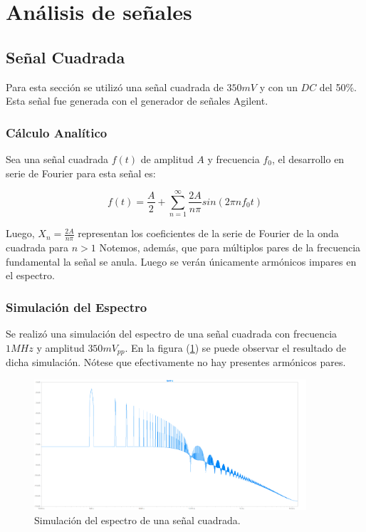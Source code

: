 \section{Análisis de señales}

\subsection{Señal Cuadrada}

Para esta sección se utilizó una señal cuadrada de $350mV$ y con un $DC$ del 50\%. Esta señal fue generada con el generador de señales Agilent.

\subsubsection{Cálculo Analítico}

Sea una señal cuadrada $f(t)$ de amplitud $A$ y frecuencia $f_0$, el desarrollo en serie de Fourier para esta señal es:

\begin{equation}
    f(t)=\frac{A}{2}+\sum_{n=1}^{\infty} \frac{2A}{n\pi}sin(2\pi n f_0t)
    \label{eq:fouriercuadrada}
\end{equation}

Luego, $X_n=\frac{2A}{n\pi}$ representan los coeficientes de la serie de Fourier de la onda cuadrada para $n>1$ Notemos, además, que para múltiplos pares de la frecuencia fundamental la señal se anula. Luego se verán únicamente armónicos impares en el espectro.

\subsubsection{Simulación del Espectro}

Se realizó una simulación del espectro de una señal cuadrada con frecuencia $1 MHz$ y amplitud $350 mV_{pp}$. En la figura (\ref{fig:simcuad}) se puede observar el resultado de dicha simulación. Nótese que efectivamente no hay presentes armónicos pares.

\begin{figure}[H]
	\centering
	\includegraphics[width=0.9\textwidth]{ImagenesEjercicio2/FFT-Cuadrada.png}
\caption{Simulación del espectro de una señal cuadrada.}
	\label{fig:simcuad}
\end{figure}


